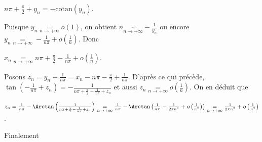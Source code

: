 {{\begin{center}
$n\pi+ \frac{\pi}{2}+y_n = -\mathrm{cotan}(y_n)$.
\end{center}

Puisque $y_n\underset{n\rightarrow+\infty}{=}o(1)$, on obtient $n\underset{n\rightarrow+\infty}{\sim}- \frac{1}{y_n}$  ou encore $y_n\underset{n\rightarrow+\infty}{=} - \frac{1}{n\pi}+o\left( \frac{1}{n}\right)$. Donc

\begin{center}
$x_n\underset{n\rightarrow+\infty}{=} n\pi+ \frac{\pi}{2}- \frac{1}{n\pi}+o\left( \frac{1}{n}\right)$.
\end{center}

Posons $z_n = y_n+ \frac{1}{n\pi}= x_n-n\pi- \frac{\pi}{2}+ \frac{1}{n\pi}$. D'après ce qui précède, $\tan\left(- \frac{1}{n\pi}+z_n\right)=- \frac{1}{n\pi+ \frac{\pi}{2}- \frac{1}{n\pi}+z_n}$ et aussi $z_n\underset{n\rightarrow+\infty}{=}o\left( \frac{1}{n}\right)$. On en déduit que

\begin{center}
$z_n= \frac{1}{n\pi}-\Arctan\left( \frac{1}{n\pi+ \frac{\pi}{2}- \frac{1}{n\pi}+z_n}\right)\underset{n\rightarrow+\infty}{=} \frac{1}{n\pi}-\Arctan\left( \frac{1}{n\pi}- \frac{1}{2\pi n^2}+o\left( \frac{1}{n^2}\right)\right)\underset{n\rightarrow+\infty}{=} \frac{1}{2\pi n^2}+o\left( \frac{1}{n^2}\right)$.
\end{center}

Finalement

\begin{center}
\end{center}}
}
